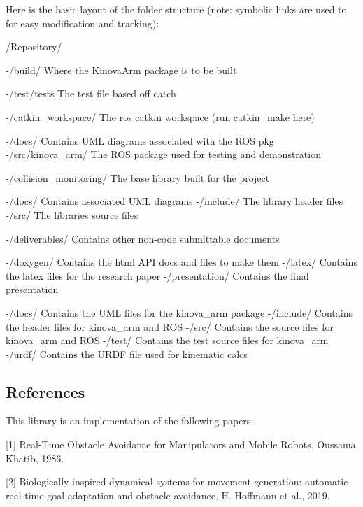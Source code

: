 Here is the basic layout of the folder structure (note\+: symbolic links are used to for easy modification and tracking)\+: \begin{DoxyVerb}/Repository/

    -/build/                    Where the KinovaArm package is to be built

        -/test/tests            The test file based off catch

    -/catkin_workspace/         The ros catkin workspace (run catkin_make here)

        -/docs/                 Contains UML diagrams associated with the ROS pkg
        -/src/kinova_arm/       The ROS package used for testing and demonstration

    -/collision_monitoring/     The base library built for the project

        -/docs/                 Contains associated UML diagrams
        -/include/              The library header files
        -/src/                  The libraries source files

    -/deliverables/             Contains other non-code submittable documents

        -/doxygen/              Contains the html API docs and files to make them
        -/latex/                Contains the latex files for the research paper
        -/presentation/         Contains the final presentation

    -/docs/                     Contains the UML files for the kinova_arm package
    -/include/                  Contains the header files for kinova_arm and ROS
    -/src/                      Contains the source files for kinova_arm and ROS
    -/test/                     Contains the test source files for kinova_arm
    -/urdf/                     Contains the URDF file used for kinematic calcs
\end{DoxyVerb}


\subsection*{References}

This library is an implementation of the following papers\+:


\begin{DoxyItemize}
\item \mbox{[}1\mbox{]} Real-\/\+Time Obstacle Avoidance for Manipulators and Mobile Robots, Oussama Khatib, 1986.
\item \mbox{[}2\mbox{]} Biologically-\/inspired dynamical systems for movement generation\+: automatic real-\/time goal adaptation and obstacle avoidance, H. Hoffmann et al., 2019. 
\end{DoxyItemize}